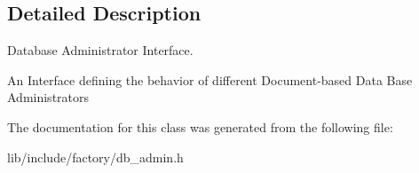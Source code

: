 \subsection{Detailed Description}
Database Administrator Interface. 

An Interface defining the behavior of different Document-\/based Data Base Administrators 

The documentation for this class was generated from the following file\-:\begin{DoxyCompactItemize}
\item 
lib/include/factory/db\-\_\-admin.\-h\end{DoxyCompactItemize}
